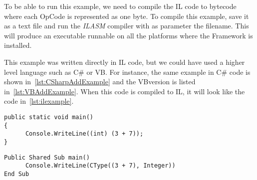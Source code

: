 To be able to run this example, we need to compile the IL code to bytecode where each OpCode is represented as one byte.
To compile this example, save it as a text file and run the \emph{ILASM} compiler with as parameter the filename.
This will produce an executable runnable on all the platforms where the \dotNET Framework is installed.

This example was written directly in IL code, but we could have used a higher level language such as C\# or VB\dotNET. For instance, the same example in C\# code is shown in~\autoref{lst:CSharpAddExample} and the VB\dotNET version is listed in~\autoref{lst:VBAddExample}. When this code is compiled to IL, it will look like the code in~\autoref{lst:ilexample}.

\begin{lstlisting}[language={[Sharp]C},style=listing,caption={Adding example in the C\# language},label={lst:CSharpAddExample}]
public static void main()
{
      Console.WriteLine((int) (3 + 7));
} 
\end{lstlisting} 

\begin{lstlisting}[language={[Visual]{Basic}},style=listing,caption={Adding example in the VB\dotNET language},label={lst:VBAddExample}]
Public Shared Sub main()
      Console.WriteLine(CType((3 + 7), Integer))
End Sub
\end{lstlisting} 

 
